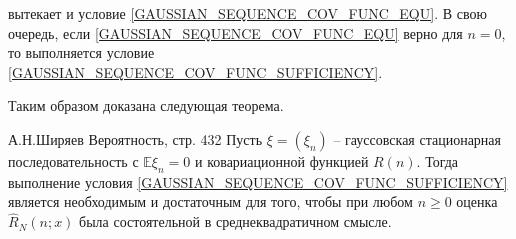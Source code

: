		\noindent вытекает и условие \eqref{GAUSSIAN_SEQUENCE_COV_FUNC_EQU}. В свою очередь, если \eqref{GAUSSIAN_SEQUENCE_COV_FUNC_EQU} верно для $n = 0$, то выполняется условие \eqref{GAUSSIAN_SEQUENCE_COV_FUNC_SUFFICIENCY}.
		
		Таким образом доказана следующая теорема.
		
		\begin{Theorem}{А.Н.Ширяев Вероятность, стр. 432}
			Пусть $\xi = (\xi_n)$ -- гауссовская стационарная последовательность с $\mathbb{E}\xi_n = 0$ и ковариационной функцией $R(n)$. Тогда выполнение условия \eqref{GAUSSIAN_SEQUENCE_COV_FUNC_SUFFICIENCY} является необходимым и достаточным для того, чтобы при любом $n \geqslant 0$ оценка $\hat{R}_N(n; x)$ была состоятельной в среднеквадратичном смысле.
		\end{Theorem}
	
